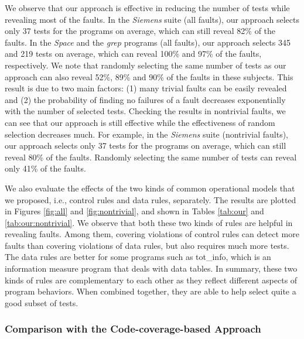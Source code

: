 \documentclass{sig-alternate}
\begin{document}
We observe that our approach is effective in reducing the number of
tests while revealing most of the faults. In the \emph{Siemens}
suite (all faults), our approach selects only 37 tests for the
programs on average, which can still reveal 82\% of the faults. In
the \emph{Space} and the \emph{grep} programs (all faults), our
approach selects 345 and 219 tests on average, which can reveal
100\% and 97\% of the faults, respectively. We note that randomly
selecting the same number of tests as our approach can also reveal
52\%, 89\% and 90\% of the faults in these subjects. This result is
due to two main factors: (1) many trivial faults can be easily
revealed and (2) the probability of finding no failures of a fault
decreases exponentially with the number of selected tests. Checking
the results in nontrivial faults, we can see that our approach is
still effective while the effectiveness of random selection
decreases much. For example, in the \emph{Siemens} suite (nontrivial
faults), our approach selects only 37 tests for the programs on
average, which can still reveal 80\% of the faults. Randomly
selecting the same number of tests can reveal only 41\% of the
faults.

\vspace{0.2in} We also evaluate the effects of the two kinds of
common operational models that we proposed, i.e., control rules and
data rules, separately. The results are plotted in Figures
\ref{fig:all} and \ref{fig:nontrivial}, and shown in Tables
\ref{tab:our} and \ref{tab:our:nontrivial}. We observe that both
these two kinds of rules are helpful in revealing faults. Among
them, covering violations of control rules can detect more faults
than covering violations of data rules, but also requires much more
tests. The data rules are better for some programs such as
tot\_info, which is an information measure program that deals with
data tables. In summary, these two kinds of rules are complementary
to each other as they reflect different aspects of program
behaviors. When combined together, they are able to help select
quite a good subset of tests.




\subsubsection{Comparison with the Code-coverage-based Approach}
\end{document}
